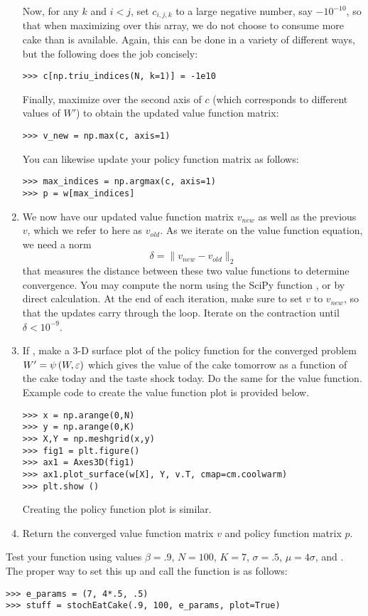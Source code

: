 \begin{problem}
\begin{enumerate}
Now, for any $k$ and $i < j$, set $c_{i,j,k}$ to a large negative number, say $-10^{-10}$,
so that when maximizing over this array, we do not choose to consume more cake than is available.
Again, this can be done in a variety of different ways, but the following does the job concisely:
\begin{lstlisting}
>>> c[np.triu_indices(N, k=1)] = -1e10
\end{lstlisting}

Finally, maximize over the second axis of $c$ (which corresponds to different values of $W'$)
to obtain the updated value function matrix:
\begin{lstlisting}
>>> v_new = np.max(c, axis=1)
\end{lstlisting}
You can likewise update your policy function matrix as follows:
\begin{lstlisting}
>>> max_indices = np.argmax(c, axis=1)
>>> p = w[max_indices]
\end{lstlisting}

\item We now have our updated value function matrix $v_{new}$ as well as the
previous $v$, which we refer to here as $v_{old}$. As we iterate on the value function equation, we need a norm
\begin{equation*}
\delta = \|v_{new} - v_{old}\|_2
\end{equation*}
that measures the distance between these two value functions to determine convergence.
You may compute the norm using the SciPy function , or by direct calculation.
At the end of each iteration, make sure to set $v$ to $v_{new}$, so that the updates carry through the
loop.
Iterate on the contraction until $\delta < 10^{-9}$.

\item If , make a 3-D surface plot of the policy function for the converged problem
$W' = \psi\left(W,\varepsilon\right)$ which gives the value of the cake tomorrow as a
function of the cake today  and the taste shock today.  Do the same for the value function.
Example code to create the value function plot is provided below.
\begin{lstlisting}
>>> x = np.arange(0,N)
>>> y = np.arange(0,K)
>>> X,Y = np.meshgrid(x,y)
>>> fig1 = plt.figure()
>>> ax1 = Axes3D(fig1)
>>> ax1.plot_surface(w[X], Y, v.T, cmap=cm.coolwarm)
>>> plt.show ()
\end{lstlisting}
Creating the policy function plot is similar.

\item Return the converged value function matrix $v$ and policy function matrix $p$.


\end{enumerate}
Test your function using values $\beta = .9$, $N = 100$, $K = 7$, $\sigma = .5$, $\mu = 4\sigma$,
and .
The proper way to set this up and call the function is as follows:
\begin{lstlisting}
>>> e_params = (7, 4*.5, .5)
>>> stuff = stochEatCake(.9, 100, e_params, plot=True)
\end{lstlisting}
\end{problem}


